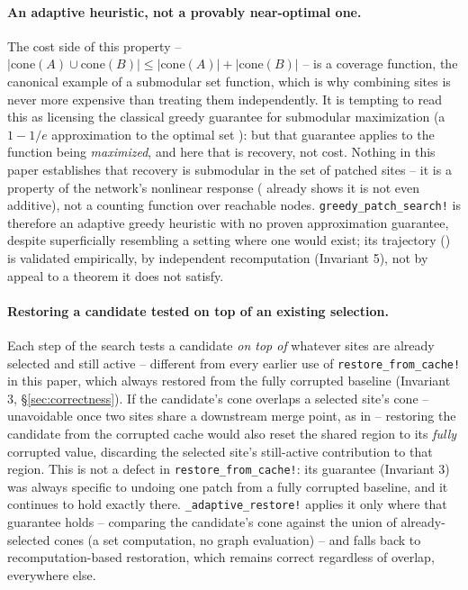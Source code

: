 \documentclass{article}
\begin{document}
\paragraph{An adaptive heuristic, not a provably near-optimal one.} The cost side of this
property -- $|\text{cone}(A) \cup \text{cone}(B)| \le |\text{cone}(A)| + |\text{cone}(B)|$ -- is a
coverage function, the canonical example of a submodular set function, which is why combining
sites is never more expensive than treating them independently. It is tempting to read this as
licensing the classical greedy guarantee for submodular maximization (a $1 - 1/e$ approximation to
the optimal set \cite{submodular}): but that guarantee applies to the function being
\emph{maximized}, and here that is recovery, not cost. Nothing in this paper establishes that
recovery is submodular in the set of patched sites -- it is a property of the network's nonlinear
response ( already shows it is not even additive), not a counting function
over reachable nodes. \texttt{greedy\_patch\_search!} is therefore an adaptive greedy heuristic
with no proven approximation guarantee, despite superficially resembling a setting where one would
exist; its trajectory () is validated empirically, by independent recomputation
(Invariant 5), not by appeal to a theorem it does not satisfy.

\paragraph{Restoring a candidate tested on top of an existing selection.} Each step of the search
tests a candidate \emph{on top of} whatever sites are already selected and still active --
different from every earlier use of \texttt{restore\_from\_cache!} in this paper, which always
restored from the fully corrupted baseline (Invariant 3, \S\ref{sec:correctness}). If the
candidate's cone overlaps a selected site's cone -- unavoidable once two sites share a downstream
merge point, as in  -- restoring the candidate from the corrupted cache would
also reset the shared region to its \emph{fully} corrupted value, discarding the selected site's
still-active contribution to that region. This is not a defect in \texttt{restore\_from\_cache!}:
its guarantee (Invariant 3) was always specific to undoing one patch from a fully corrupted
baseline, and it continues to hold exactly there. \texttt{\_adaptive\_restore!} applies it only
where that guarantee holds -- comparing the candidate's cone against the union of already-selected
cones (a set computation, no graph evaluation) -- and falls back to recomputation-based
restoration, which remains correct regardless of overlap, everywhere else.
\end{document}

